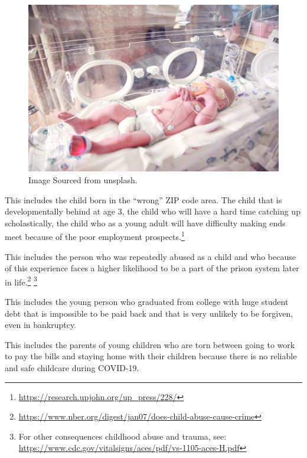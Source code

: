 \documentclass[
]{book}
\begin{document}
\begin{figure}

{\centering \includegraphics[width=0.5\linewidth]{img/intro/fig4} 

}

\caption{Image Sourced from unsplash.}\label{fig:intro04}
\end{figure}

This includes the child born in the ``wrong'' ZIP code area. The child that is developmentally behind at age 3, the child who will have a hard time catching up scholastically, the child who as a young adult will have difficulty making ends meet because of the poor employment prospects.\footnote{\url{https://research.upjohn.org/up_press/228/}}

This includes the person who was repeatedly abused as a child and who because of this experience faces a higher likelihood to be a part of the prison system later in life.\footnote{\url{https://www.nber.org/digest/jan07/does-child-abuse-cause-crime}} \footnote{For other consequences childhood abuse and trauma, see:
  \url{https://www.cdc.gov/vitalsigns/aces/pdf/vs-1105-aces-H.pdf}}

This includes the young person who graduated from college with huge student debt that is impossible to be paid back and that is very unlikely to be forgiven, even in bankruptcy.

This includes the parents of young children who are torn between going to work to pay the bills and staying home with their children because there is no reliable and safe childcare during COVID-19.
\end{document}
